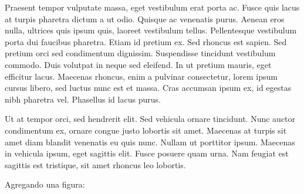 \documentclass{article}
\begin{document}
        Praesent tempor vulputate massa, eget vestibulum erat porta ac. Fusce quis lacus at turpis pharetra dictum a ut odio. Quisque ac venenatis purus. Aenean eros nulla, ultrices quis ipsum quis, laoreet vestibulum tellus. Pellentesque vestibulum porta dui faucibus pharetra. Etiam id pretium ex. Sed rhoncus est sapien. Sed pretium orci sed condimentum dignissim. Suspendisse tincidunt vestibulum commodo. Duis volutpat in neque sed eleifend. In ut pretium mauris, eget efficitur lacus. Maecenas rhoncus, enim a pulvinar consectetur, lorem ipsum cursus libero, sed luctus nunc est et massa. Cras accumsan ipsum ex, id egestas nibh pharetra vel. Phasellus id lacus purus.

        Ut at tempor orci, sed hendrerit elit. Sed vehicula ornare tincidunt. Nunc auctor condimentum ex, ornare congue justo lobortis sit amet. Maecenas at turpis sit amet diam blandit venenatis eu quis nunc. Nullam ut porttitor ipsum. Maecenas in vehicula ipsum, eget sagittis elit. Fusce posuere quam urna. Nam feugiat est sagittis est tristique, sit amet rhoncus leo lobortis.
        
        Agregando una figura:
        
                
\end{document}
